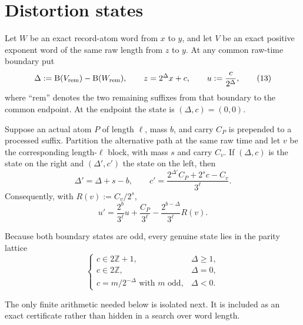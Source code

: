 \documentclass[11pt]{article}
\newcommand{\mass}{\operatorname{B}}
\begin{document}
\section{Distortion states}

Let $W$ be an exact record-atom word from $x$ to $y$, and let $V$ be
an exact positive exponent word of the same raw length from $z$ to $y$.
At any common raw-time boundary put
\[
 \Delta:=\mass(V_{\rm rem})-\mass(W_{\rm rem}),
 \qquad z=2^\Delta x+c,
 \qquad u:=\frac{c}{2^\Delta},
 \tag{13}
\]
where ``rem'' denotes the two remaining suffixes from that boundary to
the common endpoint.  At the endpoint the state is $(\Delta,c)=(0,0)$.

Suppose an actual atom $P$ of length $\ell$, mass $b$, and carry $C_P$
is prepended to a processed suffix.  Partition the alternative path at
the same raw time and let $v$ be the corresponding length-$\ell$ block,
with mass $s$ and carry $C_v$.  If $(\Delta,c)$ is the state on the right
and $(\Delta',c')$ the state on the left, then
\[
 \boxed{
 \Delta'=\Delta+s-b,
 \qquad
 c'=\frac{2^{\Delta'}C_P+2^s c-C_v}{3^\ell}.}
 \tag{14}
\]
Consequently, with $R(v):=C_v/2^s$,
\[
 \boxed{
 u'=\frac{2^b}{3^\ell}u+\frac{C_P}{3^\ell}
       -\frac{2^{b-\Delta}}{3^\ell}R(v).}
 \tag{15}
\]

Because both boundary states are odd, every genuine state lies in the
parity lattice
\[
 \begin{cases}
 c\in2\mathbb Z+1,&\Delta\geq1,\\
 c\in2\mathbb Z,&\Delta=0,\\
 c=m/2^{-\Delta}\text{ with }m\text{ odd},&\Delta<0.
 \end{cases}
 \tag{16}
\]

The only finite arithmetic needed below is isolated next.  It is included
as an exact certificate rather than hidden in a search over word length.
\end{document}

